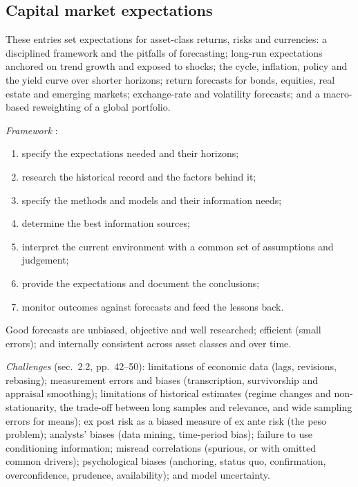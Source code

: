 \subsection{Capital market expectations}

These entries set expectations for asset-class returns, risks and currencies: a disciplined framework and the pitfalls of forecasting; long-run expectations anchored on trend growth and exposed to shocks; the cycle, inflation, policy and the yield curve over shorter horizons; return forecasts for bonds, equities, real estate and emerging markets; exchange-rate and volatility forecasts; and a macro-based reweighting of a global portfolio.

\begin{qfmethod}\label{meth:cme-framework-forecasting}
 \emph{Framework} \citep[chap.~3, sec.~2.1, pp.~39--42]{portfolio-management-in-practice-v1-2020}:
\begin{enumerate}
\item specify the expectations needed and their horizons;
\item research the historical record and the factors behind it;
\item specify the methods and models and their information needs;
\item determine the best information sources;
\item interpret the current environment with a common set of assumptions and judgement;
\item provide the expectations and document the conclusions;
\item monitor outcomes against forecasts and feed the lessons back.
\end{enumerate}
Good forecasts are unbiased, objective and well researched; efficient (small errors); and internally consistent across asset classes and over time.

\emph{Challenges} (sec.~2.2, pp.~42--50): limitations of economic data (lags, revisions, rebasing); measurement errors and biases (transcription, survivorship and appraisal smoothing); limitations of historical estimates (regime changes and non-stationarity, the trade-off between long samples and relevance, and wide sampling errors for means); ex post risk as a biased measure of ex ante risk (the peso problem); analysts' biases (data mining, time-period bias); failure to use conditioning information; misread correlations (spurious, or with omitted common drivers); psychological biases (anchoring, status quo, confirmation, overconfidence, prudence, availability); and model uncertainty.


\end{qfmethod}
